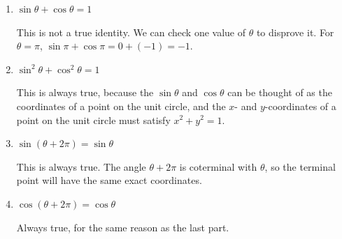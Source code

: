 \documentclass[main]{subfiles}
\begin{document}
\begin{enumerate}[resume]
{\begin{enumerate}
    \begin{solution}
        This is not a true identity. In standard position, the angle $\theta$ and $-\theta$ are vertical reflections of each other over the $x$-axis. Thus, the $x$-coordinate corresponding to $\theta$ and the $x$-coordinate corresponding to $-\theta$ will always be the same, not opposites, $\cos(-\theta) = \cos(\theta)$.
    \end{solution}

        \item 
    \begin{problem}
        $\sin\theta + \cos\theta =1$
    \end{problem}

    \begin{solution}
        This is not a true identity. We can check one value of $\theta$ to disprove it. For $\theta=\pi$, $\sin\pi + \cos\pi = 0 + (-1) = -1$.
    \end{solution}

        \item 
    \begin{problem}
        $\sin^2 \theta + \cos^2\theta = 1$
    \end{problem}

    \begin{solution}
        This is always true, because the $\sin\theta$ and $\cos\theta$ can be thought of as the coordinates of a point on the unit circle, and the $x$- and $y$-coordinates of a point on the unit circle must satisfy $x^2+y^2=1$.
    \end{solution}

        \item 
    \begin{problem}
        $\sin(\theta+2\pi)=\sin\theta$
    \end{problem}

    \begin{solution}
        This is always true. The angle $\theta + 2\pi$ is coterminal with $\theta$, so the terminal point will have the same exact coordinates.
    \end{solution}

        \item 
    \begin{problem}
        $\cos(\theta+2\pi) = \cos\theta$
    \end{problem}

    \begin{solution}
        Always true, for the same reason as the last part. 
    \end{solution}
\end{enumerate}
}
  
\end{enumerate}
\end{document}
